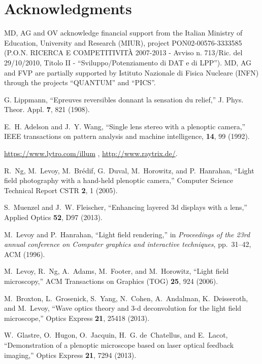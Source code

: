 \documentclass[aps,pra,amssymb,twocolumn,amsmath,superscriptaddress,showpacs,10pt]{revtex4-1}
\begin{document}
\section{Acknowledgments}

MD, AG and OV acknowledge financial support from the Italian Ministry of Education, University and Research (MIUR), project PON02-00576-3333585 (P.O.N. RICERCA E COMPETITIVIT\`A 2007-2013 - Avviso n. 713/Ric. del 29/10/2010, Titolo II - ``Sviluppo/Potenziamento di DAT e di LPP''). MD, AG and FVP are partially supported by Istituto Nazionale di Fisica Nucleare (INFN) through the projects ``QUANTUM'' and ``PICS''.


\begin{thebibliography}{10}

G. Lippmann, ``Epreuves reversibles donnant la sensation du relief,'' J. Phys. Theor. Appl. \textbf{7}, 821 (1908).

E.~H. Adelson and J.~Y. Wang, ``Single lens stereo with a plenoptic camera,'' IEEE transactions on pattern analysis and machine intelligence, \textbf{14}, 99 (1992).

\url{https://www.lytro.com/illum} , \url{http://www.raytrix.de/}. %

R.~Ng, M.~Levoy, M.~Br{\'e}dif, G.~Duval, M.~Horowitz, and P.~Hanrahan, ``Light field photography with a hand-held plenoptic camera,'' Computer Science Technical Report CSTR \textbf{2}, 1 (2005).

S.~Muenzel and J.~W. Fleischer, ``Enhancing layered 3d displays with a lens,'' Applied Optics \textbf{52}, D97 (2013).

M.~Levoy and P.~Hanrahan, ``Light field rendering,'' in {\em Proceedings of the 23rd annual conference on Computer graphics and interactive techniques}, pp.~31--42, ACM (1996).

M.~Levoy, R.~Ng, A.~Adams, M.~Footer, and M.~Horowitz, ``Light field microscopy,'' ACM Transactions on Graphics (TOG) \textbf{25}, 924 (2006).

M.~Broxton, L.~Grosenick, S.~Yang, N.~Cohen, A.~Andalman, K.~Deisseroth, and M.~Levoy, ``Wave optics theory and 3-d deconvolution for the light field microscope,'' Optics Express \textbf{21}, 25418 (2013).

W.~Glastre, O.~Hugon, O.~Jacquin, H.~G. de~Chatellus, and E.~Lacot, ``Demonstration of a plenoptic microscope based on laser optical feedback imaging,'' Optics Express \textbf{21}, 7294 (2013).


\end{thebibliography}
\end{document}
